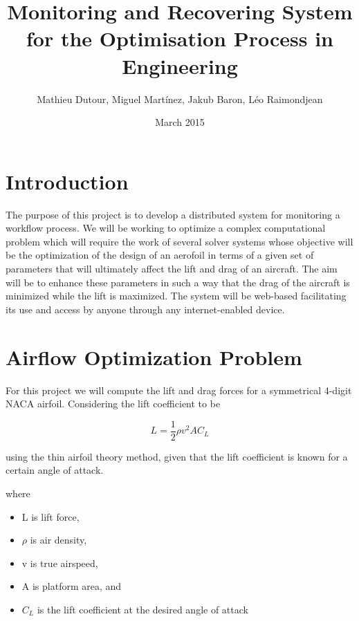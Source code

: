 \documentclass{article}
\title{Monitoring and Recovering System for the Optimisation Process in Engineering}
\author{Mathieu Dutour, Miguel Martínez, Jakub Baron, Léo Raimondjean}
\date{March 2015}
\begin{document}
\maketitle

\tableofcontents


\section{Introduction}
The purpose of this project is to develop a distributed system for monitoring a workflow process. We will be working to optimize a complex computational problem which will require the work of several solver systems whose objective will be the optimization of the design of an aerofoil in terms of a given set of parameters that will ultimately affect the lift and drag of an aircraft. The aim will be to enhance these parameters in such a way that the drag of the aircraft is minimized while the lift is maximized. The system will be web-based facilitating its use and access by anyone through any internet-enabled device.


\section{Airflow Optimization Problem}

For this project we will compute the lift and drag forces for a symmetrical 4-digit NACA airfoil. Considering the lift coefficient to be

\begin{equation}
L = \frac{1}{2}\rho v^2 A C_L
\end{equation}

using the thin airfoil theory method, given that the lift coefficient is known for a certain angle of attack.

where

\begin{itemize}
  \item L is lift force,
  \item $\rho$ is air density,
  \item v is true airspeed,
  \item A is platform area, and
  \item $C_L$ is the lift coefficient at the desired angle of attack
\end{itemize}
\end{document}
